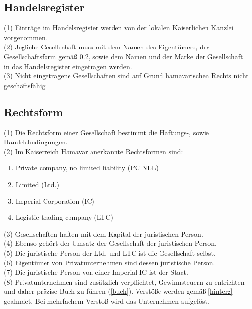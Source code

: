 \documentclass{article}
\begin{document}
\subsection{Handelsregister}\label{register}
(1) Einträge im Handelsregister werden von der lokalen Kaiserlichen Kanzlei vorgenommen.\\
(2) Jegliche Gesellschaft muss mit dem Namen des Eigentümers, der Gesellschaftsform gemäß \ref{gesellform}, sowie dem Namen und der Marke der Gesellschaft in das Handelsregister eingetragen werden.\\
(3) Nicht eingetragene Gesellschaften sind auf Grund hamavarischen Rechts nicht geschäftsfähig.

\subsection{Rechtsform}\label{gesellform}
(1) Die Rechtsform einer Gesellschaft bestimmt die Haftungs-, sowie Handelsbedingungen.\\
(2) Im Kaiserreich Hamavar anerkannte Rechtsformen sind:
\begin{enumerate}
	\item Private company, no limited liability (PC NLL)
	\item Limited (Ltd.)
	\item Imperial Corporation (IC)
	\item Logistic trading company (LTC)
\end{enumerate}
(3) Gesellschaften haften mit dem Kapital der juristischen Person.\\
(4) Ebenso gehört der Umsatz der Gesellschaft der juristischen Person.\\
(5) Die juristische Person der Ltd. und LTC ist die Gesellschaft selbst.\\
(6) Eigentümer von Privatunternehmen sind dessen juristische Person.\\
(7) Die juristische Person von einer Imperial IC ist der Staat.\\
(8) Privatunternehmen sind zusätzlich verpflichtet, Gewinnsteuern zu entrichten und daher präzise Buch zu führen (\ref{buch}). Verstöße werden gemäß \ref{hinterz} geahndet. Bei mehrfachem Verstoß wird das Unternehmen aufgelöst.
\end{document}
